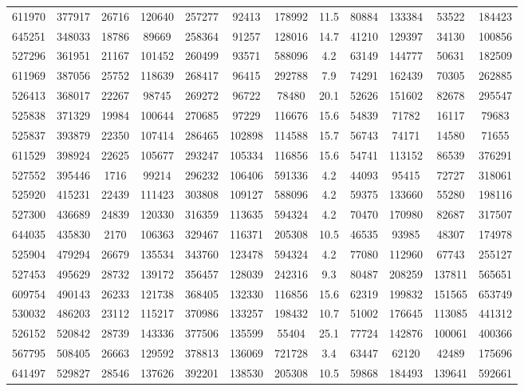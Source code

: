 \documentclass[DM,lsstdraft,toc,usenatbib]{lsstdoc}
\begin{document}
\begin{landscape}
\begin{longtable}{cccccccccccc}
611970 & 377917 & 26716 & 120640 & 257277 & 92413 & 178992 & 11.5 & 80884 & 133384 & 53522 & 184423 \\
645251 & 348033 & 18786 & 89669 & 258364 & 91257 & 128016 & 14.7 & 41210 & 129397 & 34130 & 100856 \\
527296 & 361951 & 21167 & 101452 & 260499 & 93571 & 588096 & 4.2 & 63149 & 144777 & 50631 & 182509 \\
611969 & 387056 & 25752 & 118639 & 268417 & 96415 & 292788 & 7.9 & 74291 & 162439 & 70305 & 262885 \\
526413 & 368017 & 22267 & 98745 & 269272 & 96722 & 78480 & 20.1 & 52626 & 151602 & 82678 & 295547 \\
525838 & 371329 & 19984 & 100644 & 270685 & 97229 & 116676 & 15.6 & 54839 & 71782 & 16117 & 79683 \\
525837 & 393879 & 22350 & 107414 & 286465 & 102898 & 114588 & 15.7 & 56743 & 74171 & 14580 & 71655 \\
611529 & 398924 & 22625 & 105677 & 293247 & 105334 & 116856 & 15.6 & 54741 & 113152 & 86539 & 376291 \\
527552 & 395446 & 1716 & 99214 & 296232 & 106406 & 591336 & 4.2 & 44093 & 95415 & 72727 & 318061 \\
525920 & 415231 & 22439 & 111423 & 303808 & 109127 & 588096 & 4.2 & 59375 & 133660 & 55280 & 198116 \\
527300 & 436689 & 24839 & 120330 & 316359 & 113635 & 594324 & 4.2 & 70470 & 170980 & 82687 & 317507 \\
644035 & 435830 & 2170 & 106363 & 329467 & 116371 & 205308 & 10.5 & 46535 & 93985 & 48307 & 174978 \\
525904 & 479294 & 26679 & 135534 & 343760 & 123478 & 594324 & 4.2 & 77080 & 112960 & 67743 & 255127 \\
527453 & 495629 & 28732 & 139172 & 356457 & 128039 & 242316 & 9.3 & 80487 & 208259 & 137811 & 565651 \\
609754 & 490143 & 26233 & 121738 & 368405 & 132330 & 116856 & 15.6 & 62319 & 199832 & 151565 & 653749 \\
530032 & 486203 & 23112 & 115217 & 370986 & 133257 & 198432 & 10.7 & 51002 & 176645 & 113085 & 441312 \\
526152 & 520842 & 28739 & 143336 & 377506 & 135599 & 55404 & 25.1 & 77724 & 142876 & 100061 & 400366 \\
567795 & 508405 & 26663 & 129592 & 378813 & 136069 & 721728 & 3.4 & 63447 & 62120 & 42489 & 175696 \\
641497 & 529827 & 28546 & 137626 & 392201 & 138530 & 205308 & 10.5 & 59868 & 184493 & 139641 & 592661 \\

\end{longtable}
\end{landscape}
\end{document}
